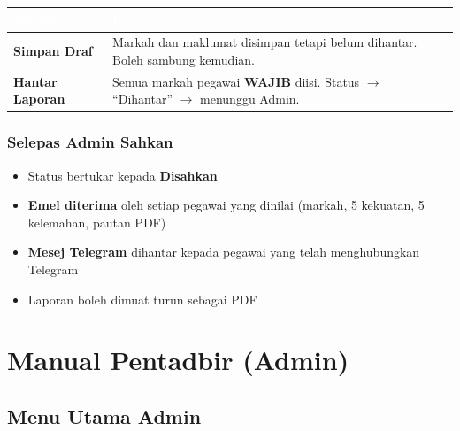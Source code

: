 \documentclass[12pt,a4paper]{report}
\newcommand{\status}[2]{\colorbox{#1!15}{\textcolor{#1}{\small\textbf{#2}}}}
\begin{document}
\begin{table}[H]
\centering
{}
\begin{tabularx}{\textwidth}{l X}
\toprule
\rowcolor{tableheader}
\textcolor{white}{\textbf{Tindakan}} & \textcolor{white}{\textbf{Penerangan}} \\
\midrule
\textbf{Simpan Draf} & Markah dan maklumat disimpan tetapi belum dihantar. Boleh sambung kemudian. \\
\textbf{Hantar Laporan} & Semua markah pegawai \textbf{WAJIB} diisi. Status $\rightarrow$ ``Dihantar'' $\rightarrow$ menunggu Admin. \\
\bottomrule
\end{tabularx}
\end{table}

\subsection{Selepas Admin Sahkan}
\begin{itemize}[label=\textcolor{successgreen}{\faCheckCircle}]
  \item Status bertukar kepada \status{successgreen}{Disahkan}
  \item \textbf{Emel diterima} oleh setiap pegawai yang dinilai (markah, 5 kekuatan, 5 kelemahan, pautan PDF)
  \item \textbf{Mesej Telegram} dihantar kepada pegawai yang telah menghubungkan Telegram
  \item Laporan boleh dimuat turun sebagai PDF
\end{itemize}

\chapter{Manual Pentadbir (Admin)}

\section{Menu Utama Admin}
\end{document}
